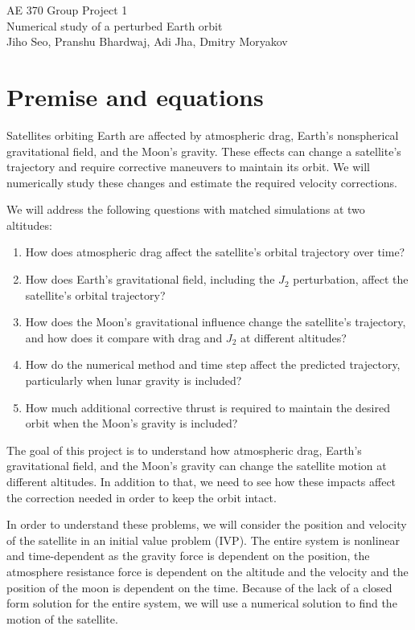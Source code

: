 \documentclass[11pt]{article}
\begin{document}
\begin{center}
{\Large AE 370 Group Project 1}\\[4pt]
{\large Numerical study of a perturbed Earth orbit}\\[5pt]
Jiho Seo, Pranshu Bhardwaj, Adi Jha, Dmitry Moryakov\\
\end{center}

\section{Premise and equations}
Satellites orbiting Earth are affected by atmospheric drag, Earth's nonspherical gravitational field, and the Moon's gravity. These effects can change a satellite's trajectory and require corrective maneuvers to maintain its orbit. We will numerically study these changes and estimate the required velocity corrections.

We will address the following questions with matched simulations at two altitudes:
\begin{enumerate}
\setlength{\itemsep}{0pt}
\setlength{\parskip}{0pt}
\item How does atmospheric drag affect the satellite's orbital trajectory over time?
\item How does Earth's gravitational field, including the $J_2$ perturbation, affect the satellite's orbital trajectory?
\item How does the Moon's gravitational influence change the satellite's trajectory, and how does it compare with drag and $J_2$ at different altitudes?
\item How do the numerical method and time step affect the predicted trajectory, particularly when lunar gravity is included?
\item How much additional corrective thrust is required to maintain the desired orbit when the Moon's gravity is included?
\end{enumerate}

The goal of this project is to understand how atmospheric drag, Earth's gravitational field, and the Moon's gravity can change the satellite motion at different altitudes. In addition to that, we need to see how these impacts affect the correction needed in order to keep the orbit intact.

In order to understand these problems, we will consider the position and velocity of the satellite in an initial value problem (IVP). The entire system is nonlinear and time-dependent as the gravity force is dependent on the position, the atmosphere resistance force is dependent on the altitude and the velocity and the position of the moon is dependent on the time. Because of the lack of a closed form solution for the entire system, we will use a numerical solution to find the motion of the satellite.
\end{document}
